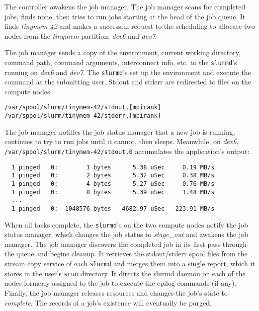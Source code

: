 The controller awakens the job manager.
The job manager scans for completed jobs, finds none, then tries to run
jobs starting at the head of the job queue.  It finds {\em tinymem-42}
and makes a successful request to the scheduling to allocate 
two nodes from the {\em tinymem} partition: {\em dev6} and {\em dev7}.

The job manager sends a copy of the environment, current working directory,
command path, command arguments, interconnect info, etc.
to the {\tt slurmd}'s running on {\em dev6} and {\em dev7}.  
The {\tt slurmd}'s set up the environment and execute the command as 
the submitting user.  Stdout and stderr are redirected to files on the 
compute nodes:

\begin{verbatim}
/var/spool/slurm/tinymem-42/stdout.[mpirank]
/var/spool/slurm/tinymem-42/stderr.[mpirank]
\end{verbatim}

The job manager notifies the job status manager that a new job is running,
continues to try to run jobs until it cannot, then sleeps.
Meanwhile, on {\em dev6}, {\tt /var/spool/slurm/tinymem-42/stdout.0}
accumulates the application's output:

\begin{verbatim}
  1 pinged   0:        1 bytes      5.38 uSec     0.19 MB/s                     
  1 pinged   0:        2 bytes      5.32 uSec     0.38 MB/s                     
  1 pinged   0:        4 bytes      5.27 uSec     0.76 MB/s                     
  1 pinged   0:        8 bytes      5.39 uSec     1.48 MB/s                     
  ...
  1 pinged   0:  1048576 bytes   4682.97 uSec   223.91 MB/s              
\end{verbatim}

When all tasks complete, the {\tt slurmd}'s on the two compute nodes notify
the job status manager, which changes the job status to {\em stage\_out} and 
awakens the job manager.  The job manager discovers the completed job in
its first pass through the queue and begins cleanup.
It retrieves the stdout/stderr spool files from the stream copy service
of each {\tt slurmd} and merges them into a single report, 
which it stores in the user's {\tt srun} directory.
It directs the slurmd daemon on each of the nodes formerly assigned to the 
job to execute the epilog commands (if any).
Finally, the job manager releases resources and changes the job's state to 
{\em complete}. The records of a job's existence will eventually be purged.


